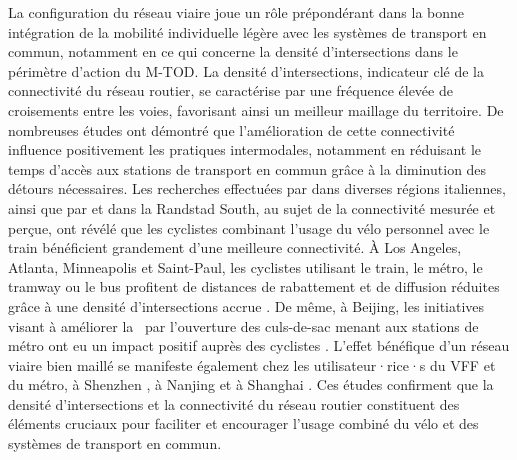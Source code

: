 \begin{refsegment}
La configuration du réseau viaire joue un rôle prépondérant dans la bonne intégration de la mobilité individuelle légère avec les systèmes de transport en commun, notamment en ce qui concerne la densité d'intersections dans le périmètre d'action du \acrshort{M-TOD}. La densité d'intersections, indicateur clé de la connectivité du réseau routier, se caractérise par une fréquence élevée de croisements entre les voies, favorisant ainsi un meilleur maillage du territoire. De nombreuses études ont démontré que l'amélioration de cette connectivité influence positivement les pratiques intermodales, notamment en réduisant le temps d'accès aux stations de transport en commun grâce à la diminution des détours nécessaires. Les recherches effectuées par \textcolor{blue}{\textcite[8]{giansoldati_train-feeder_2021}} dans diverses régions italiennes, ainsi que par \textcolor{blue}{\textcite[4-7]{geurs_multi-modal_2016}} et \textcolor{blue}{\textcite[45]{la_paix_puello_modelling_2015}} dans la Randstad South, au sujet de la connectivité mesurée et perçue, ont révélé que les cyclistes combinant l'usage du vélo personnel avec le train bénéficient grandement d'une meilleure connectivité. À Los Angeles, Atlanta, Minneapolis et Saint-Paul, les cyclistes utilisant le train, le métro, le tramway ou le bus profitent de distances de rabattement et de diffusion réduites grâce à une densité d'intersections accrue \textcolor{blue}{\autocite[26]{hochmair_assessment_2015}}. De même, à Beijing, les initiatives visant à améliorer la ~par l'ouverture des culs-de-sac menant aux stations de métro ont eu un impact positif auprès des cyclistes \textcolor{blue}{\autocite[6]{wang_interchange_2016}}. L'effet bénéfique d'un réseau viaire bien maillé se manifeste également chez les utilisateur·rice·s du \acrshort{VFF} et du métro, à Shenzhen \textcolor{blue}{\autocite[6]{wang_relationship_2020}}, à Nanjing \textcolor{blue}{\autocite[182]{cheng_exploring_2022}} et à Shanghai \textcolor{blue}{\autocite[30]{lin_analysis_2019}}. Ces études confirment que la densité d'intersections et la connectivité du réseau routier constituent des éléments cruciaux pour faciliter et encourager l'usage combiné du vélo et des systèmes de transport en commun.%


\end{refsegment}
